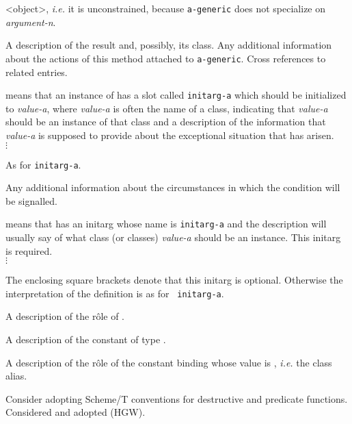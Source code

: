\begin{optDefinition}
\begin{specargs}
{        <object>}, {\em i.e.} it is unconstrained, because {\tt a-generic} does
    not specialize on {\em argument-n}.
\end{specargs}
%
\result%
A description of the result and, possibly, its class.
%
\remarks%
Any additional information about the actions of this method attached
to {\tt a-generic}.
%
\seealso%
Cross references to related entries.
%
%
\begin{initoptions}
    \item[initarg-a, value-a] means that an instance of {\tt <a-condition>} has
    a slot called {\tt initarg-a} which should be initialized to {\em value-a},
    where {\em value-a} is often the name of a class, indicating that {\em
        value-a} should be an instance of that class and a description of the
    information that {\em value-a} is
    supposed to provide about the exceptional situation that has arisen.\\
    $\vdots$
    \item[initarg-n, value-n] As for {\tt initarg-a}.
\end{initoptions}
%
\remarks%
Any additional information about the circumstances in which the
condition will be signalled.
%
%
\begin{initoptions}
    \item[initarg-a, value-a] means that {\tt <a-class>} has an
    initarg whose name is {\tt initarg-a} and the description will usually
    say of what class (or classes) {\em value-a} should be an instance.
    This initarg is required.\\ $\vdots$
    \item[{\tt[}initarg-n, value-n{\tt]}]
    The enclosing square brackets denote that this initarg is optional.
    Otherwise the interpretation of the definition is as for {\tt
        initarg-a}.
\end{initoptions}
%
\remarks%
A description of the r\^ole of {\tt <a-class>}.

%
\remarks%
A description of the constant of type .

%
\remarks%
A description of the r\^ole of the constant binding whose value is
, {\em i.e.} the class alias.

\end{optDefinition}
%
%
\begin{optPrivate}
    Consider adopting Scheme/T conventions for destructive and predicate
    functions.  Considered and adopted (HGW).
\end{optPrivate}

